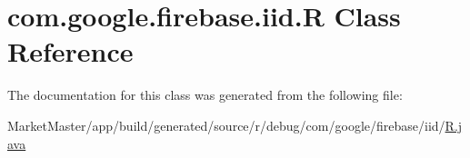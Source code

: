 \hypertarget{classcom_1_1google_1_1firebase_1_1iid_1_1R}{}\section{com.\+google.\+firebase.\+iid.\+R Class Reference}
\label{classcom_1_1google_1_1firebase_1_1iid_1_1R}


The documentation for this class was generated from the following file\+:\begin{DoxyCompactItemize}
\item 
Market\+Master/app/build/generated/source/r/debug/com/google/firebase/iid/\mbox{\hyperlink{debug_2com_2google_2firebase_2iid_2R_8java}{R.\+java}}\end{DoxyCompactItemize}
